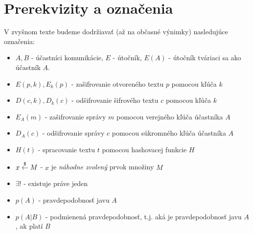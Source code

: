\section{Prerekvizity a označenia}


V zvyšnom texte budeme dodržiavať (až na občasné výnimky) nasledujúce
označenia:
\begin{itemize}
\item $A,B$ - účastníci komunikácie, $E$ - útočník, $E(A)$ - útočník
            tváriaci sa ako účastník $A$.
\item $E(p,k), E_k(p)$ - zašifrovanie otvoreného textu $p$ pomocou kľúča $k$
\item $D(c,k), D_k(c)$ - odšifrovanie šifrového textu $c$ pomocou kľúča $k$
\item $E_A(m)$ - zašifrovanie správy $m$ pomocou verejného kľúča účastníka $A$
\item $D_A(c)$ - odšifrovanie správy $c$ pomocou súkromného kľúča účastníka $A$
\item $H(t)$ - spracovanie textu $t$ pomocou hashovacej funkcie $H$
\item $x \overset{\$}{\leftarrow} M$ - $x$ je \emph{náhodne zvolený} prvok množiny $M$
\item $\exists !$ - existuje práve jeden
\item $p(A)$ - pravdepodobnosť javu $A$
\item $p(A|B)$ - podmienená pravdepodobnosť, t.j. aká je pravdepodobnosť javu $A$, ak platí $B$
\end{itemize}
